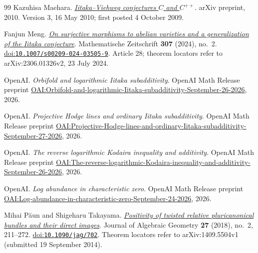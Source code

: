\begin{thebibliography}{99}
Kazuhisa Maehara.
\emph{\href{https://arxiv.org/abs/0910.0604v3}{{Iitaka--Viehweg} conjectures {$C$} and {$C^{++}$}}}.
arXiv preprint, 2010.
Version 3, 16 May 2010; first posted 4 October 2009.

Fanjun Meng.
\emph{\href{https://arxiv.org/abs/2306.01326v2}{On surjective morphisms to abelian varieties and a generalization of the {Iitaka} conjecture}}.
Mathematische Zeitschrift \textbf{307} (2024), no.~2.
\href{https://doi.org/10.1007/s00209-024-03505-9}{doi:\nolinkurl{10.1007/s00209-024-03505-9}}.
Article 28; theorem locators refer to arXiv:2306.01326v2, 23 July 2024.

{\raggedright {OpenAI}.
\emph{Orbifold and logarithmic Iitaka subadditivity}.
OpenAI Math Release preprint
\href{https://github.com/openai/math/blob/main/preprints/Orbifold-and-logarithmic-Iitaka-subadditivity-September-26-2026/paper.pdf}{OAI:Orbifold-and-logarithmic-Iitaka-subadditivity-September-26-2026}, 2026.\par}

{\raggedright {OpenAI}.
\emph{Projective Hodge lines and ordinary Iitaka subadditivity}.
OpenAI Math Release preprint
\href{https://github.com/openai/math/blob/main/preprints/Projective-Hodge-lines-and-ordinary-Iitaka-subadditivity-September-27-2026/paper.pdf}{OAI:Projective-Hodge-lines-and-ordinary-Iitaka-subadditivity-September-27-2026}, 2026.\par}

{\raggedright {OpenAI}.
\emph{The reverse logarithmic Kodaira inequality and additivity}.
OpenAI Math Release preprint
\href{https://github.com/openai/math/blob/main/preprints/The-reverse-logarithmic-Kodaira-inequality-and-additivity-September-26-2026/paper.pdf}{OAI:The-reverse-logarithmic-Kodaira-inequality-and-additivity-September-26-2026}, 2026.\par}

{\raggedright {OpenAI}.
\emph{Log abundance in characteristic zero}.
OpenAI Math Release preprint
\href{https://github.com/openai/math/blob/main/preprints/Log-abundance-in-characteristic-zero-September-24-2026/paper.pdf}{OAI:Log-abundance-in-characteristic-zero-September-24-2026}, 2026.\par}

Mihai P{\u a}un and Shigeharu Takayama.
\emph{\href{https://arxiv.org/abs/1409.5504v1}{Positivity of twisted relative pluricanonical bundles and their direct images}}.
Journal of Algebraic Geometry \textbf{27} (2018), no.~2, 211--272.
\href{https://doi.org/10.1090/jag/702}{doi:\nolinkurl{10.1090/jag/702}}.
Theorem locators refer to arXiv:1409.5504v1 (submitted 19 September 2014).


\end{thebibliography}
